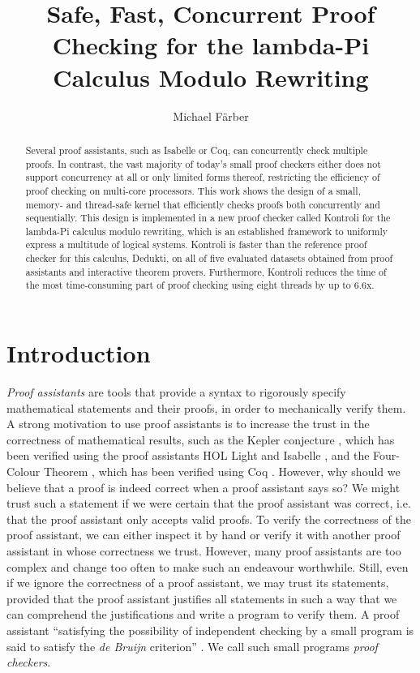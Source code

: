 \documentclass[screen,sigplan,10pt]{acmart}
\title{Safe, Fast, Concurrent Proof Checking for the lambda-Pi Calculus Modulo
Rewriting}
\author{Michael Färber}
\affiliation{
  \institution{University of Innsbruck}
  \city{Innsbruck}
  \country{Austria}
}
\date{}
\begin{document}
\begin{abstract}
Several proof assistants, such as Isabelle or Coq, can concurrently
check multiple proofs. In contrast, the vast majority of today's small
proof checkers either does not support concurrency at all or only
limited forms thereof, restricting the efficiency of proof checking on
multi-core processors. This work shows the design of a small, memory-
and thread-safe kernel that efficiently checks proofs both concurrently
and sequentially. This design is implemented in a new proof checker
called Kontroli for the lambda-Pi calculus modulo rewriting, which is an
established framework to uniformly express a multitude of logical
systems. Kontroli is faster than the reference proof checker for this
calculus, Dedukti, on all of five evaluated datasets obtained from proof
assistants and interactive theorem provers. Furthermore, Kontroli
reduces the time of the most time-consuming part of proof checking using
eight threads by up to 6.6x.
\end{abstract}
\maketitle


\hypertarget{introduction}{%
\section{Introduction}\label{introduction}}

\emph{Proof assistants} are tools that provide a syntax to rigorously
specify mathematical statements and their proofs, in order to
mechanically verify them. A strong motivation to use proof assistants is
to increase the trust in the correctness of mathematical results, such
as the Kepler conjecture \citep{hales2017}, which has been verified
using the proof assistants HOL Light \citep{DBLP:conf/tphol/Harrison09a}
and Isabelle \citep{DBLP:conf/tphol/WenzelPN08}, and the Four-Colour
Theorem \citep{gonthier2008}, which has been verified using Coq
\citep{DBLP:conf/tphol/Bertot08}. However, why should we believe that a
proof is indeed correct when a proof assistant says so? We might trust
such a statement if we were certain that the proof assistant was
correct, i.e. that the proof assistant only accepts valid proofs. To
verify the correctness of the proof assistant, we can either inspect it
by hand or verify it with another proof assistant in whose correctness
we trust. However, many proof assistants are too complex and change too
often to make such an endeavour worthwhile. Still, even if we ignore the
correctness of a proof assistant, we may trust its statements, provided
that the proof assistant justifies all statements in such a way that we
can comprehend the justifications and write a program to verify them. A
proof assistant ``satisfying the possibility of independent checking by
a small program is said to satisfy the \emph{de Bruijn} criterion''
\citep{barendregt2005}. We call such small programs \emph{proof
checkers}.
\end{document}
